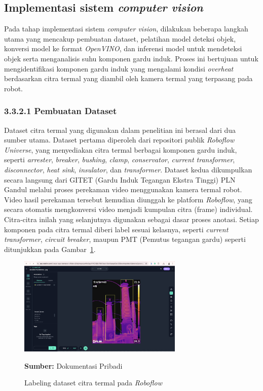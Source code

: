 \subsection{Implementasi sistem \emph{computer vision}}
Pada tahap implementasi sistem \emph{computer vision}, dilakukan beberapa langkah utama yang mencakup pembuatan dataset, pelatihan model deteksi objek, konversi model ke format \emph{OpenVINO}, dan inferensi model untuk mendeteksi objek serta menganalisis suhu komponen gardu induk. Proses ini bertujuan untuk mengidentifikasi komponen gardu induk yang mengalami kondisi \emph{overheat} berdasarkan citra termal yang diambil oleh kamera termal yang terpasang pada robot.


\subsubsection{3.3.2.1 Pembuatan Dataset}
Dataset citra termal yang digunakan dalam penelitian ini berasal dari dua sumber utama. Dataset pertama diperoleh dari repositori publik \emph{Roboflow Universe}, yang menyediakan citra termal berbagai komponen gardu induk, seperti \emph{arrester}, \emph{breaker}, \emph{bushing}, \emph{clamp}, \emph{conservator}, \emph{current transformer}, \emph{disconnector}, \emph{heat sink}, \emph{insulator}, dan \emph{transformer}. Dataset kedua dikumpulkan secara langsung dari GITET (Gardu Induk Tegangan Ekstra Tinggi) PLN Gandul melalui proses perekaman video menggunakan kamera termal robot. Video hasil perekaman tersebut kemudian diunggah ke platform \emph{Roboflow}, yang secara otomatis mengkonversi video menjadi kumpulan citra (frame) individual. Citra-citra inilah yang selanjutnya digunakan sebagai dasar proses anotasi. Setiap komponen pada citra termal diberi label sesuai kelasnya, seperti \emph{current transformer}, \emph{circuit breaker}, maupun PMT (Pemutus tegangan gardu) seperti ditunjukkan pada Gambar~\ref{fig:dataset-annotated}. 
\begin{figure}[H]
  \centering
  \includegraphics[width=0.7\textwidth]{gambar/bab3/dataset-anotated.png}
  \caption{Labeling dataset citra termal pada \emph{Roboflow}}
  \label{fig:dataset-annotated}
  \footnotesize{\textbf{Sumber:} Dokumentasi Pribadi}
  \end{figure}
  
